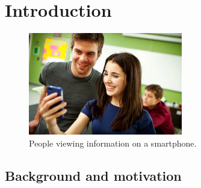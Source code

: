 

%

\chapter{Introduction}
\label{introduction}

\begin{figure}[b!]
  \centering
    \includegraphics[width=0.6\textwidth]{images/girlboyad}
  \caption{People viewing information on a smartphone.}
  \label{tide}
\end{figure}

\section{Background and motivation}

